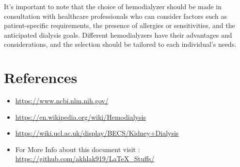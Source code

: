 \documentclass[12pt, a4paper]{article} %
\begin{document}
It's important to note that the choice of hemodialyzer should be made in consultation with healthcare professionals who can consider factors such as patient-specific requirements, the presence of allergies or sensitivities, and the anticipated dialysis goals. Different hemodialyzers have their advantages and considerations, and the selection should be tailored to each individual's needs.

\BgThispage

\section{References}

\begin{itemize}
    \item \url{https://www.ncbi.nlm.nih.gov/}
    \item \url{https://en.wikipedia.org/wiki/Hemodialysis}
    \item \url{https://wiki.ucl.ac.uk/display/BECS/Kidney+Dialysis}
    \item For More Info about this document visit : \url{https://github.com/akhlak919/LaTeX_Stuffs/}
\end{itemize}
\end{document}
